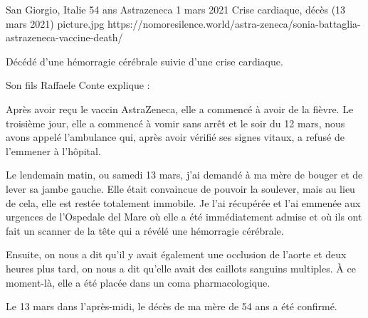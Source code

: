 {San Giorgio, Italie}
{54 ans}
{Astrazeneca}
{1 mars 2021}
{Crise cardiaque, décès (13 mars 2021)}
{picture.jpg}
{https://nomoresilence.world/astra-zeneca/sonia-battaglia-astrazeneca-vaccine-death/}
{

Décédé d'une hémorragie cérébrale suivie d'une crise cardiaque.

Son fils Raffaele Conte explique :

Après avoir reçu le vaccin AstraZeneca, elle a commencé à avoir de la fièvre. Le
troisième jour, elle a commencé à vomir sans arrêt et le soir du 12 mars, nous
avons appelé l'ambulance qui, après avoir vérifié ses signes vitaux, a refusé de
l'emmener à l'hôpital.

Le lendemain matin, ou samedi 13 mars, j'ai demandé à ma mère de bouger et de
lever sa jambe gauche. Elle était convaincue de pouvoir la soulever, mais au
lieu de cela, elle est restée totalement immobile. Je l'ai récupérée et l'ai
emmenée aux urgences de l'Ospedale del Mare où elle a été immédiatement admise
et où ils ont fait un scanner de la tête qui a révélé une hémorragie cérébrale.

Ensuite, on nous a dit qu'il y avait également une occlusion de l'aorte et deux
heures plus tard, on nous a dit qu'elle avait des caillots sanguins multiples. À
ce moment-là, elle a été placée dans un coma pharmacologique.

Le 13 mars dans l'après-midi, le décès de ma mère de 54 ans a été confirmé.

}
